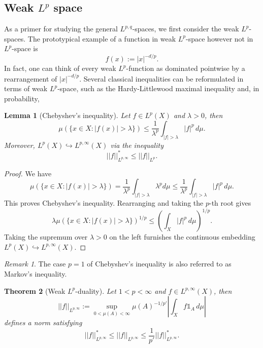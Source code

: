 \documentclass[reqno]{amsart}
\newtheorem{theorem}{Theorem}
\newtheorem{lemma}[theorem]{Lemma}
\theoremstyle{definition}
\theoremstyle{remark}
\newtheorem*{remark}{Remark}
\begin{document}
\subsection{Weak $L^p$ space}


As a primer for studying the general $L^{p, q}$-spaces, we first consider the weak $L^p$-spaces. The prototypical example of a function in weak $L^p$-space however not in $L^p$-space is
	\[ f(x) := |x|^{-d/p}. \]
In fact, one can think of every weak $L^p$-function as dominated pointwise by a rearrangement of $|x|^{-d/p}$. Several classical inequalities can be reformulated in terms of weak $L^p$-space, such as the Hardy-Littlewood maximal inequality and, in probability, 

\begin{lemma}[Chebyshev's inequality]
	Let $f \in L^p (X)$ and $\lambda > 0$, then 
		\[ \mu(\{ x \in X : |f(x)| > \lambda \}) \leq \frac{1}{\lambda^p} \int_{|f| > \lambda} |f|^p \, d\mu. \]
	Moreover, $L^p (X) \hookrightarrow L^{p, \infty} (X)$ via the inequality
		\[ ||f||_{L^{p, \infty}}^* \leq ||f||_{L^p}. \]	
\end{lemma}

\begin{proof}
	We have
		\[ \mu (\{ x \in X : |f(x)| > \lambda\}) = \frac{1}{\lambda^p} \int_{|f| > \lambda} \lambda^p d \mu \leq \frac{1}{\lambda^p}\int_{|f| > \lambda} |f|^p \, d\mu. \]
	This proves Chebyshev's inequality. Rearranging and taking the $p$-th root gives
		\[ \lambda \mu(\{ x \in X : |f(x)| > \lambda \})^{1/p} \leq \left( \int_X |f|^p \, d \mu \right)^{1/p}.\]
	Taking the supremum over $\lambda > 0$ on the left furnishes the continuous embedding $L^p (X) \hookrightarrow L^{p, \infty} (X)$. 
\end{proof}

\begin{remark}
	The case $p = 1$ of Chebyshev's inequality is also referred to as Markov's inequality. 
\end{remark}



\begin{theorem}[Weak $L^p$-duality]
	Let $1 < p < \infty$ and $f \in L^{p, \infty} (X)$, then 
		\[ ||f||_{L^{p, \infty}} := \sup_{0 < \mu(A) < \infty} \mu(A)^{-1/p'} \left|\int_X f \mathbb 1_A \, d\mu\right| \]
	defines a norm satisfying
		\[ ||f||_{L^{p, \infty}}^* \leq ||f||_{L^{p, \infty}} \leq \frac{1}{p'} ||f||_{L^{p, \infty}}^*. \]	 
\end{theorem}
\end{document}
